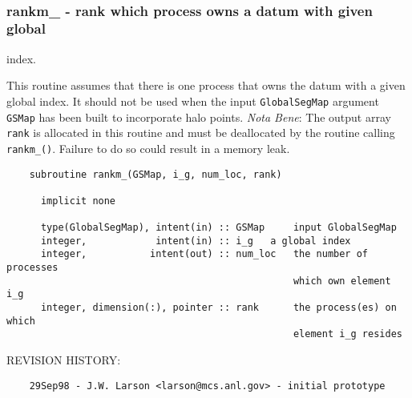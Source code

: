  
\mbox{}\hrulefill\ 
 

 \subsubsection{rankm\_ - rank which process owns a datum with given global }


  index.
 
  This routine assumes that there is one process that owns the datum with
  a given global index.  It should not be used when the input 
  {\tt GlobalSegMap} argument {\tt GSMap} has been built to incorporate
  halo points.  {\em Nota Bene}:  The output array {\tt rank} is allocated 
  in this routine and must be deallocated by the routine calling 
  {\tt rankm\_()}.  Failure to do so could result in a memory leak.
 
\begin{verbatim} 
    subroutine rankm_(GSMap, i_g, num_loc, rank)
 
      implicit none
 
      type(GlobalSegMap), intent(in) :: GSMap     input GlobalSegMap
      integer,            intent(in) :: i_g	  a global index
      integer,           intent(out) :: num_loc   the number of processes
                                                  which own element i_g
      integer, dimension(:), pointer :: rank      the process(es) on which 
                                                  element i_g resides\end{verbatim}{\sf REVISION HISTORY:}
\begin{verbatim}  	29Sep98 - J.W. Larson <larson@mcs.anl.gov> - initial prototype\end{verbatim}

